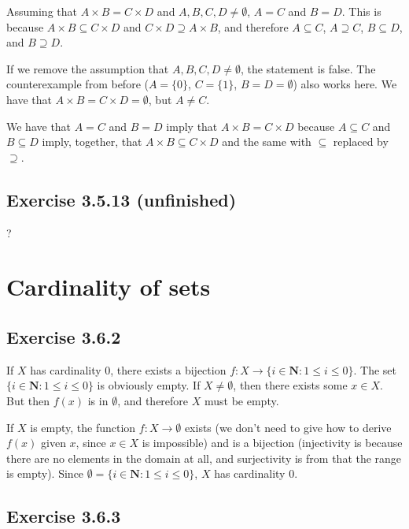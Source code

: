 \documentclass[12pt, oneside]{book}
\begin{document}
	Assuming that $A \times B = C \times D$ and $A, B, C, D \ne \emptyset$, $A = C$ and $B = D$. This is because $A \times B \subseteq C \times D$ and $C \times D \supseteq A \times B$, and therefore $A \subseteq C$, $A \supseteq C$, $B \subseteq D$, and $B \supseteq D$.
	
	If we remove the assumption that $A, B, C, D \ne \emptyset$, the statement is false. The counterexample from before ($A = \{0\}$, $C = \{1\}$, $B = D = \emptyset$) also works here. We have that $A \times B = C \times D = \emptyset$, but $A \ne C$.
	
	We have that $A = C$ and $B = D$ imply that $A \times B = C \times D$ because $A \subseteq C$ and $B \subseteq D$ imply, together, that $A \times B \subseteq C \times D$ and the same with $\subseteq$ replaced by $\supseteq$.
	
	\subsection*{Exercise 3.5.13 (unfinished)}
	
	?
	
	\section{Cardinality of sets}
	
	\subsection*{Exercise 3.6.2}
	
	If $X$ has cardinality $0$, there exists a bijection $f \colon X \rightarrow \{i \in \mathbf{N}: 1 \le i \le 0\}$. The set $\{i \in \mathbf{N}: 1 \le i \le 0\}$ is obviously empty. If $X \ne \emptyset$, then there exists some $x \in X$. But then $f(x)$ is in $\emptyset$, and therefore $X$ must be empty.
	
	If $X$ is empty, the function $f \colon X \rightarrow \emptyset$ exists (we don't need to give how to derive $f(x)$ given $x$, since $x \in X$ is impossible) and is a bijection (injectivity is because there are no elements in the domain at all, and surjectivity is from that the range is empty). Since $\emptyset = \{i \in \mathbf{N}: 1 \le i \le 0\}$, $X$ has cardinality $0$.
	
	\subsection*{Exercise 3.6.3}
	
\end{document}
